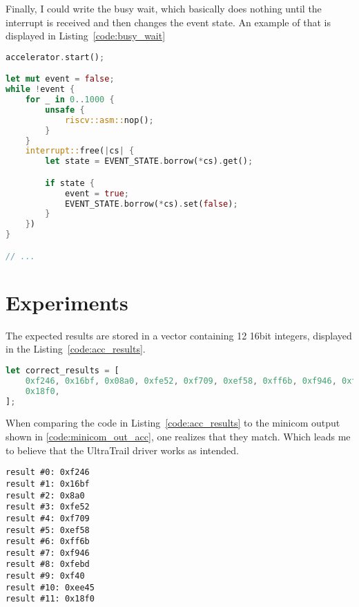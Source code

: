Finally, I could write the busy wait, which basically does nothing until the interrupt is received
and then changes the event state.
An example of that is displayed in Listing~\ref{code:busy_wait}

\begin{lstlisting}[style=colorEX,language=Rust,caption={Snippet of the busy wait that waits for UltraTrail to finish},label={code:busy_wait}]
accelerator.start();

let mut event = false;
while !event {
    for _ in 0..1000 {
        unsafe {
            riscv::asm::nop();
        }
    }
    interrupt::free(|cs| {
        let state = EVENT_STATE.borrow(*cs).get();

        if state {
            event = true;
            EVENT_STATE.borrow(*cs).set(false);
        }
    })
}

// ...
\end{lstlisting}

\section{Experiments}

The expected results are stored in a vector containing 12 16bit integers, displayed in the Listing~\ref{code:acc_results}.

\begin{lstlisting}[style=colorEX,language=Rust,caption={The expected results from the driver test},label={code:acc_results}]
let correct_results = [
    0xf246, 0x16bf, 0x08a0, 0xfe52, 0xf709, 0xef58, 0xff6b, 0xf946, 0xfebd, 0x0f40, 0xee45,
    0x18f0,
];
\end{lstlisting}

When comparing the code in Listing~\ref{code:acc_results} to the minicom output shown in \ref{code:minicom_out_acc},
one realizes that they match. Which leads me to believe that the UltraTrail driver works as intended.

\begin{lstlisting}[style=colorEx,caption={Minicom output after executing the driver test},label={code:minicom_out_acc}]
result #0: 0xf246
result #1: 0x16bf
result #2: 0x8a0
result #3: 0xfe52
result #4: 0xf709
result #5: 0xef58
result #6: 0xff6b
result #7: 0xf946
result #8: 0xfebd
result #9: 0xf40
result #10: 0xee45
result #11: 0x18f0
\end{lstlisting}


